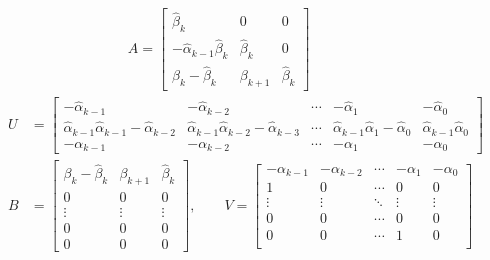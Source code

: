 \begin{subequations}
\begin{align}
& \qquad \qquad \qquad\quad A=\begin{bmatrix}
\hat{\beta}_k & 0 & 0\\
-\hat{\alpha}_{k-1}\hat{\beta}_{k} & \hat{\beta}_{k} & 0\\
\beta_k-\hat{\beta}_k & \beta_{k+1} & \hat{\beta}_k
\end{bmatrix}\\
U &= \begin{bmatrix}
-\hat{\alpha}_{k-1} &-\hat{\alpha}_{k-2} & \cdots & -\hat{\alpha}_1 & -\hat{\alpha}_0\\
\hat{\alpha}_{k-1}\hat{\alpha}_{k-1}-\hat{\alpha}_{k-2} & \hat{\alpha}_{k-1}\hat{\alpha}_{k-2}-\hat{\alpha}_{k-3} & \cdots & \hat{\alpha}_{k-1}\hat{\alpha}_1-\hat{\alpha}_0 & \hat{\alpha}_{k-1}\hat{\alpha}_0\\
-\alpha_{k-1} & -\alpha_{k-2} & \cdots & -\alpha_1 & -\alpha_0
\end{bmatrix}\\
B&=\begin{bmatrix}
\beta_k-\hat{\beta}_k & \beta_{k+1} & \hat{\beta}_k\\
0 & 0 & 0\\
\vdots & \vdots & \vdots \\
0 & 0 & 0\\
0 & 0 & 0
\end{bmatrix},\qquad V=\begin{bmatrix}
-\alpha_{k-1} & -\alpha_{k-2} & \cdots & -\alpha_1 & -\alpha_0\\
1 & 0 & \cdots & 0 & 0\\
\vdots & \vdots & \ddots & \vdots & \vdots \\
0 & 0 & \cdots & 0 & 0\\
0 & 0 & \cdots & 1 & 0\\
\end{bmatrix}
\end{align}
\end{subequations}
